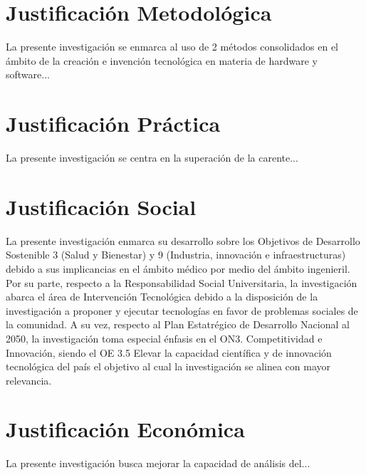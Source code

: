 \section{Justificación Metodológica}
    \begin{sectext}
        La presente investigación se enmarca al uso de 2 métodos consolidados en el ámbito de la creación e invención tecnológica en materia de hardware y software...
    \end{sectext}

\section{Justificación Práctica}
    \begin{sectext}
        La presente investigación se centra en la superación de la carente...
    \end{sectext}

\section{Justificación Social}
    \begin{sectext}
        La presente investigación enmarca su desarrollo sobre los Objetivos de Desarrollo Sostenible 3 (Salud y Bienestar) y 9 (Industria, innovación e infraestructuras) debido a sus implicancias en el ámbito médico por medio del ámbito ingenieril. Por su parte, respecto a la Responsabilidad Social Universitaria, la investigación abarca el área de Intervención Tecnológica debido a la disposición de la investigación a proponer y ejecutar tecnologías en favor de problemas sociales de la comunidad. A su vez, respecto al Plan Estatrégico de Desarrollo Nacional al 2050, la investigación toma especial énfasis en el ON3. Competitividad e Innovación, siendo el OE 3.5 Elevar la capacidad científica y de innovación tecnológica del país el objetivo al cual la investigación se alinea con mayor relevancia.
    \end{sectext}

\section{Justificación Económica}
    \begin{sectext}
        La presente investigación busca mejorar la capacidad de análisis del...
    \end{sectext}